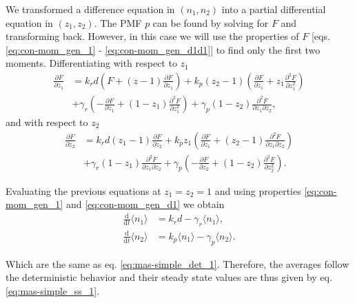 We transformed a difference equation in $(n_1,n_2)$ into a partial differential equation in $(z_1,z_2)$. The PMF $p$ can be found by solving for $F$ and transforming back. However, in this case we will use the properties of $F$ [eqs. \eqref{eq:con-mom_gen_1} - \eqref{eq:con-mom_gen_d1d1}] to find only the first two moments. Differentiating with respect to $z_1$
\begin{equation}
  \label{eq:dz1}
  \begin{split}
    \frac{\partial \dot{F}}{\partial z_1} &= k_rd\left( F+(z-1)\frac{\partial F}{\partial z_1} \right) + k_p(z_2-1) \left( \frac{\partial F}{\partial z_1} + z_1 \frac{\partial^2 F}{\partial z_1^2} \right)\\
    &+\gamma_r\left(-\frac{\partial F}{\partial z_1}+(1-z_1)\frac{\partial^2 F}{\partial z_1^2}\right)+\gamma_p(1-z_2)\frac{\partial^2 F}{\partial z_1 \partial z_2},
  \end{split}
\end{equation}
and with respect to $z_2$
\begin{equation}
  \label{eq:dz2}
  \begin{split}
    \frac{\partial \dot{F}}{\partial z_2}&=k_rd(z_1-1)\frac{\partial F}{\partial z_2} + k_pz_1\left(\frac{\partial F}{\partial z_1} + (z_2-1)\frac{\partial^2 F}{\partial z_1 \partial z_2} \right)\\
    &+ \gamma_r(1-z_1)\frac{\partial^2 F}{\partial z_1 \partial z_2} + \gamma_p\left(-\frac{\partial F}{\partial z_2}+(1-z_2)\frac{\partial^2 F}{\partial z_2^2}\right).
  \end{split}
\end{equation}

Evaluating the previous equations at $z_1 = z_2 = 1$ and using properties \eqref{eq:con-mom_gen_1} and \eqref{eq:con-mom_gen_d1} we obtain
\begin{align*}
\frac{\mathrm{d}}{\mathrm{d}t}\langle n_1 \rangle&= k_rd - \gamma_r \langle n_1 \rangle,\\
\frac{\mathrm{d}}{\mathrm{d}t}\langle n_2 \rangle&= k_p\langle n_1 \rangle - \gamma_p \langle n_2 \rangle.
\end{align*}

Which are the same as eq. \eqref{eq:mas-simple_det_1}. Therefore, the averages follow the deterministic behavior and their steady state values are thus given by eq. \eqref{eq:mas-simple_ss_1}.


